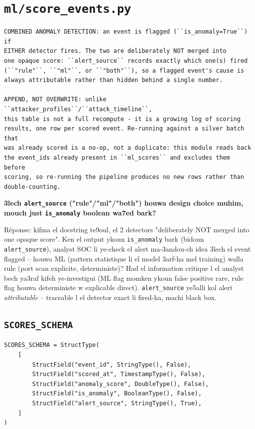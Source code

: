 \documentclass[11pt,a4paper]{report}
\DeclareRobustCommand{\code}[1]{\texttt{#1}}
\DeclareRobustCommand{\file}[1]{\texttt{\color{amber}#1}}
\begin{document}
\section{\file{ml/score\_events.py}}

\begin{lstlisting}[style=pystyle]
COMBINED ANOMALY DETECTION: an event is flagged (``is_anomaly=True``) if
EITHER detector fires. The two are deliberately NOT merged into
one opaque score: ``alert_source`` records exactly which one(s) fired
(``"rule"``, ``"ml"``, or ``"both"``), so a flagged event's cause is
always attributable rather than hidden behind a single number.

APPEND, NOT OVERWRITE: unlike ``attacker_profiles``/``attack_timeline``,
this table is not a full recompute - it is a growing log of scoring
results, one row per scored event. Re-running against a silver batch that
was already scored is a no-op, not a duplicate: this module reads back
the event_ids already present in ``ml_scores`` and excludes them before
scoring, so re-running the pipeline produces no new rows rather than
double-counting.
\end{lstlisting}

\begin{soual}
\textbf{3lech \code{alert\_source} ("rule"/"ml"/"both") houwa design
choice muhim, mouch just \code{is\_anomaly} boolean wa7ed bark?}

Réponse: kifma el docstring te9oul, el 2 detectors "deliberately NOT
merged into one opaque score". Ken el output ykoun \code{is\_anomaly}
bark (bidoun \code{alert\_source}), analyst SOC li ye-check el alert
ma-3andou-ch idea 3lech el event flagged -- houwa ML (pattern statistique
li el model 3arf-ha mel training) walla rule (port scan explicite,
deterministe)? Had el information critique l el analyst bech ya3raf
kifeh ye-investigui (ML flag momken ykoun false positive rare, rule
flag houwa deterministe w explicable direct). \code{alert\_source}
ye5alli kol alert \emph{attributable} -- traceable l el detector
exact li fired-ha, machi black box.
\end{soual}

\subsection{\code{SCORES\_SCHEMA}}

\begin{lstlisting}[style=pystyle]
SCORES_SCHEMA = StructType(
    [
        StructField("event_id", StringType(), False),
        StructField("scored_at", TimestampType(), False),
        StructField("anomaly_score", DoubleType(), False),
        StructField("is_anomaly", BooleanType(), False),
        StructField("alert_source", StringType(), True),
    ]
)
\end{lstlisting}
\end{document}
